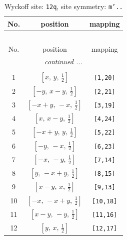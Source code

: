 \documentclass[fleqn,8pt]{jsarticle}
\begin{document}
\begin{longtable}{ccc}
\caption{Wyckoff site: {\tt 12q}, site symmetry: {\tt m'..}}
 \\
 \hline \hline
No. & position & mapping \\ \hline \endfirsthead

\multicolumn{2}{l}{\tablename\ \thetable{}} \\
 \hline \hline
No. & position & mapping \\ \hline \endhead

 \hline \hline
\multicolumn{2}{r}{\footnotesize\it continued ...} \\ \endfoot

 \hline \hline
\multicolumn{2}{r}{} \\ \endlastfoot

1 & $\left[ x,\, y,\, \frac{1}{2} \right]$ & {\tt [1,20]} \\ \hline
2 & $\left[ - y,\, x - y,\, \frac{1}{2} \right]$ & {\tt [2,21]} \\ \hline
3 & $\left[ - x + y,\, - x,\, \frac{1}{2} \right]$ & {\tt [3,19]} \\ \hline
4 & $\left[ x,\, x - y,\, \frac{1}{2} \right]$ & {\tt [4,24]} \\ \hline
5 & $\left[ - x + y,\, y,\, \frac{1}{2} \right]$ & {\tt [5,22]} \\ \hline
6 & $\left[ - y,\, - x,\, \frac{1}{2} \right]$ & {\tt [6,23]} \\ \hline
7 & $\left[ - x,\, - y,\, \frac{1}{2} \right]$ & {\tt [7,14]} \\ \hline
8 & $\left[ y,\, - x + y,\, \frac{1}{2} \right]$ & {\tt [8,15]} \\ \hline
9 & $\left[ x - y,\, x,\, \frac{1}{2} \right]$ & {\tt [9,13]} \\ \hline
10 & $\left[ - x,\, - x + y,\, \frac{1}{2} \right]$ & {\tt [10,18]} \\ \hline
11 & $\left[ x - y,\, - y,\, \frac{1}{2} \right]$ & {\tt [11,16]} \\ \hline
12 & $\left[ y,\, x,\, \frac{1}{2} \right]$ & {\tt [12,17]} \\
\end{longtable}
\renewcommand{\arraystretch}{1.2}
\end{document}
